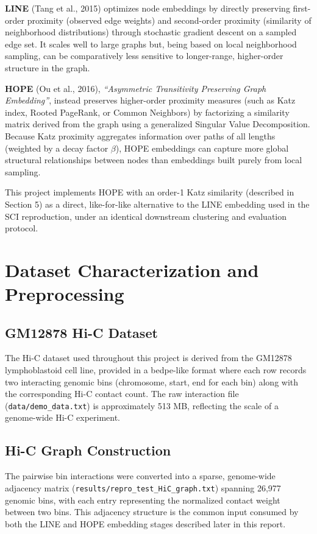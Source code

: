 \documentclass[12pt]{article}
\begin{document}
\textbf{LINE} (Tang et al., 2015) optimizes node embeddings by directly preserving first-order
proximity (observed edge weights) and second-order proximity (similarity of neighborhood
distributions) through stochastic gradient descent on a sampled edge set. It scales well to
large graphs but, being based on local neighborhood sampling, can be comparatively less sensitive
to longer-range, higher-order structure in the graph.

\textbf{HOPE} (Ou et al., 2016), \textit{``Asymmetric Transitivity Preserving Graph Embedding''},
instead preserves higher-order proximity measures (such as Katz index, Rooted PageRank, or
Common Neighbors) by factorizing a similarity matrix derived from the graph using a generalized
Singular Value Decomposition. Because Katz proximity aggregates information over paths of all
lengths (weighted by a decay factor $\beta$), HOPE embeddings can capture more global structural
relationships between nodes than embeddings built purely from local sampling.

This project implements HOPE with an order-1 Katz similarity (described in Section 5) as a
direct, like-for-like alternative to the LINE embedding used in the SCI reproduction, under an
identical downstream clustering and evaluation protocol.


\section{Dataset Characterization and Preprocessing}

\subsection{GM12878 Hi-C Dataset}
The Hi-C dataset used throughout this project is derived from the GM12878 lymphoblastoid cell
line, provided in a bedpe-like format where each row records two interacting genomic bins
(chromosome, start, end for each bin) along with the corresponding Hi-C contact count. The raw
interaction file (\texttt{data/demo\_data.txt}) is approximately 513 MB, reflecting the scale of a
genome-wide Hi-C experiment.

\subsection{Hi-C Graph Construction}
The pairwise bin interactions were converted into a sparse, genome-wide adjacency matrix
(\texttt{results/repro\_test\_HiC\_graph.txt}) spanning 26,977 genomic bins, with each entry
representing the normalized contact weight between two bins. This adjacency structure is the
common input consumed by both the LINE and HOPE embedding stages described later in this
report.
\end{document}
